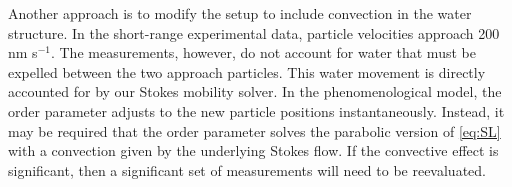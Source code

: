 Another approach is to modify the setup to include convection in the
water structure. In the short-range experimental data, particle
velocities approach 200 nm s$^{-1}$. The measurements, however, do not
account for water that must be expelled between the two approach particles.
This water movement is directly accounted for by our Stokes mobility solver.
In the phenomenological model, the order parameter adjusts to the new
particle positions instantaneously. Instead, it may be required that the
order parameter solves the parabolic version of \eqref{eq:SL} with a
convection given by the underlying Stokes flow. If the convective effect
is significant, then a significant set of measurements will need to be
reevaluated.

%
%
%

